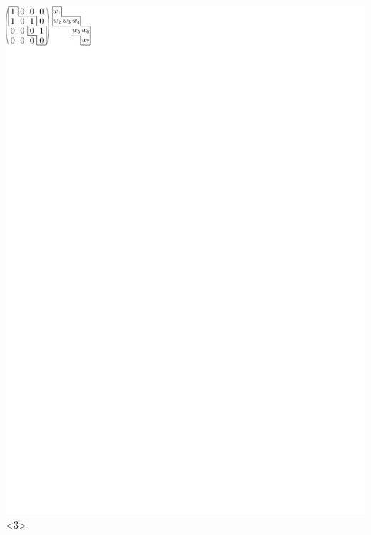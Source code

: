 \documentclass{beamer}
\begin{document}
\begin{frame}
\includegraphics{../img/walkingexample3.pdf}<3>
\end{frame}
\end{document}
